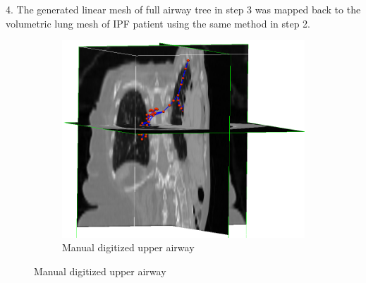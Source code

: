 4. The generated linear mesh of full airway tree in step 3 was mapped back to the volumetric lung mesh of IPF patient using the same method in step 2.

\begin{figure}[htbp] 
\centering
\begin{subfigure}{.53\linewidth}%
  \includegraphics[width=\linewidth,trim={{.0\wd0} {.0\wd0} {.0\wd0} {.0\wd0}},clip]{ModelBasedAnalysis/Image/IPF511_UpperAirwayDigitizing3.png}
  \caption{Manual digitized upper airway}

\end{subfigure}
\end{figure}
